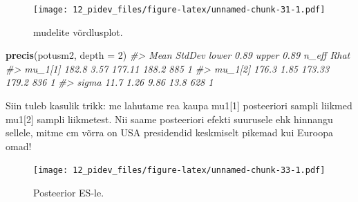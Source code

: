 \documentclass[]{book}
\newenvironment{Shaded}{\begin{snugshade}}{\end{snugshade}}
\newcommand{\CommentTok}[1]{\textcolor[rgb]{0.56,0.35,0.01}{\textit{#1}}}
\newcommand{\DataTypeTok}[1]{\textcolor[rgb]{0.13,0.29,0.53}{#1}}
\newcommand{\DecValTok}[1]{\textcolor[rgb]{0.00,0.00,0.81}{#1}}
\newcommand{\FloatTok}[1]{\textcolor[rgb]{0.00,0.00,0.81}{#1}}
\newcommand{\KeywordTok}[1]{\textcolor[rgb]{0.13,0.29,0.53}{\textbf{#1}}}
\newcommand{\NormalTok}[1]{#1}
\newcommand{\OperatorTok}[1]{\textcolor[rgb]{0.81,0.36,0.00}{\textbf{#1}}}
\newcommand{\StringTok}[1]{\textcolor[rgb]{0.31,0.60,0.02}{#1}}
\begin{document}
\begin{figure}
\centering
\texttt{[image: 12\_pidev\_files/figure-latex/unnamed-chunk-31-1.pdf]}
\caption{\label{fig:unnamed-chunk-31}mudelite võrdlusplot.}
\end{figure}

\begin{Shaded}
\begin{Highlighting}[]
\KeywordTok{precis}\NormalTok{(potusm2, }\DataTypeTok{depth =} \DecValTok{2}\NormalTok{)}
\CommentTok{#>          Mean StdDev lower 0.89 upper 0.89 n_eff Rhat}
\CommentTok{#> mu_1[1] 182.8   3.57     177.11      188.2   885    1}
\CommentTok{#> mu_1[2] 176.3   1.85     173.33      179.2   836    1}
\CommentTok{#> sigma    11.7   1.26       9.86       13.8   628    1}
\end{Highlighting}
\end{Shaded}

Siin tuleb kasulik trikk: me lahutame rea kaupa mu1{[}1{]} posteeriori sampli liikmed mu1{[}2{]} sampli liikmetest.
Nii saame posteeriori efekti suurusele ehk hinnangu sellele, mitme cm võrra on USA presidendid keskmiselt pikemad kui Euroopa omad!

\begin{Shaded}
\end{Shaded}

\begin{figure}
\centering
\texttt{[image: 12\_pidev\_files/figure-latex/unnamed-chunk-33-1.pdf]}
\caption{\label{fig:unnamed-chunk-33}Posteerior ES-le.}
\end{figure}

\begin{Shaded}
\end{Shaded}
\end{document}
